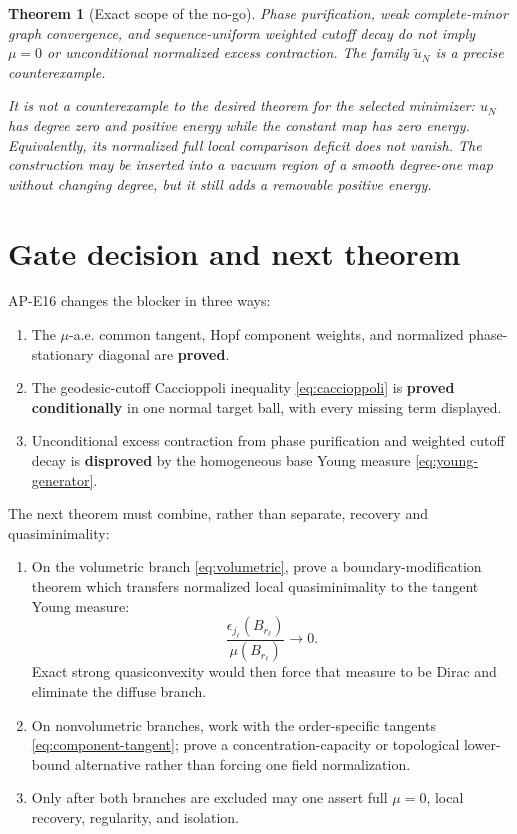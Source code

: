 \documentclass[10pt]{article}
\newtheorem{theorem}{Theorem}[section]
\begin{document}
\begin{theorem}[Exact scope of the no-go]
Phase purification, weak complete-minor graph convergence, and
sequence-uniform weighted cutoff decay do not imply $\mu=0$ or unconditional
normalized excess contraction.  The family $\widetilde u_N$ is a precise
counterexample.

It is not a counterexample to the desired theorem for the selected minimizer:
$u_N$ has degree zero and positive energy while the constant map has zero
energy.  Equivalently, its normalized full local comparison deficit does not
vanish.  The construction may be inserted into a vacuum region of a smooth
degree-one map without changing degree, but it still adds a removable
positive energy.
\end{theorem}

\section{Gate decision and next theorem}

AP-E16 changes the blocker in three ways:
\begin{enumerate}
 \item The $\mu$-a.e. common tangent, Hopf component weights, and normalized
       phase-stationary diagonal are \textbf{proved}.
 \item The geodesic-cutoff Caccioppoli inequality
       \eqref{eq:caccioppoli} is \textbf{proved conditionally} in one normal
       target ball, with every missing term displayed.
 \item Unconditional excess contraction from phase purification and weighted
       cutoff decay is \textbf{disproved} by the homogeneous base Young
       measure \eqref{eq:young-generator}.
\end{enumerate}

The next theorem must combine, rather than separate, recovery and
quasiminimality:
\begin{enumerate}
 \item On the volumetric branch \eqref{eq:volumetric}, prove a
       boundary-modification theorem which transfers normalized local
       quasiminimality to the tangent Young measure:
       \[
        \frac{\epsilon_{j_\ell}(B_{r_\ell})}
             {\mu(B_{r_\ell})}\longrightarrow0.
       \]
       Exact strong quasiconvexity would then force that measure to be Dirac
       and eliminate the diffuse branch.
 \item On nonvolumetric branches, work with the order-specific tangents
       \eqref{eq:component-tangent}; prove a concentration-capacity or
       topological lower-bound alternative rather than forcing one field
       normalization.
 \item Only after both branches are excluded may one assert full $\mu=0$,
       local recovery, regularity, and isolation.
\end{enumerate}
\end{document}
